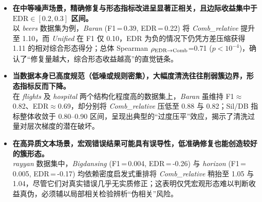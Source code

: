 \documentclass[10pt]{article} %
\numberwithin{equation}{section}
\begin{document}
\begin{itemize}[leftmargin=1.6em,itemsep=4pt]

  \item \textbf{在中等噪声场景，精确修复与形态指标改进呈显著正相关，且边际收益集中于 $\text{EDR}\in[0.2,0.3]$ 区间。}\\
        以 \textit{beers} 数据集为例，\textit{Baran} (F1\,=\,0.39, EDR\,=\,0.22) 将 \textit{Comb\_relative} 提升至 1.10，而 \textit{Unified} 在 F1 仅 0.10，EDR 为负的情况下仍凭方差压缩获得 1.11 的相对综合形态得分；总体 Spearman $\rho_{\textsuperscript{EDR$\rightarrow$Comb}}$=0.71 ($p<10^{-4}$)，\textcolor[rgb]{0.00,0.07,1.00}{确认了“修复量越大，综合形态收益越高”的直觉链条。}

  \item \textbf{当数据本身已高度规范（低噪或规则密集），大幅度清洗往往削弱簇边界，形态指标反而下降。}\\
        在 \textit{flights} 及 \textit{hospital} 两个结构化程度高的数据集上，\textit{Baran} 虽维持 F1$\approx$0.82、EDR$\approx$0.69，却分别将 \textit{Comb\_relative} 压低至 0.88 与 0.82；Sil/DB 指标整体收敛于 0.80–0.90 区间，\textcolor[rgb]{0.00,0.07,1.00}{呈现出典型的“过度压平”效应，揭示了清洗过量对层次梯度的潜在破坏。}

  \item \textbf{在高异质文本场景，宏观错误结果可能具有误导性，低准确修复也能创造较好的簇形态。}\\
        \textit{rayyan} 数据集中，\textit{Bigdansing} (F1\,=\,0.004, EDR\,=\,-0.26) 与 \textit{horizon} (F1\,=\,0.005, EDR\,=\,-0.17) 均依赖密度启发式重排将 \textit{Comb\_relative} 稍抬至 1.05 与 1.04，\textcolor[rgb]{0.00,0.07,1.00}{尽管它们对真实错误几乎无实质修正；这表明仅凭宏观形态难以判断收益真伪，必须辅以局部相关检验辨析“伪相关”风险。}

\end{itemize}

\end{document}
